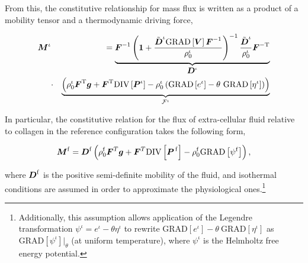 \noindent From this, the constitutive relationship for mass flux is
written as a product of a mobility tensor and a thermodynamic driving
force,

\begin{eqnarray}
\mbox{\boldmath$ M$}^\iota & &=\underbrace{\mbox{\boldmath$ F$}^{-1}\left({\bf 1} +
  \frac{\tilde{\mbox{\boldmath$ D$}}^\iota\mathrm{GRAD}\left[\mbox{\boldmath$ V$}\right]
    \mbox{\boldmath$ F$}^{-1}}{\rho^\iota_0}\right)^{-1}
  \frac{\tilde{\mbox{\boldmath$ D$}}^\iota}{\rho^\iota_0}\mbox{\boldmath$ F$}^{-\mathrm{T}}}_{\mbox{\boldmath$ D$}^\iota}
\nonumber\\ &\cdot&\underbrace{\left(\rho_0^\iota\mbox{\boldmath$ F$}^\mathrm{T}\mbox{\boldmath$ g$} +
  \mbox{\boldmath$ F$}^\mathrm{T}\mathrm{DIV}\left[\mbox{\boldmath$ P$}^\iota\right] -
  \rho^\iota_0\left(\mathrm{GRAD}\left[e^\iota\right] -
  \theta\ \mathrm{GRAD}\left[\eta^\iota\right]\right)\right)}
_{{\mathcal F}^\iota} 
\label{constitutive-relation-flux-3}
\end{eqnarray}

In particular, the constitutive relation for the flux of
extra-cellular fluid relative to collagen in the reference
configuration takes the following form,

\begin{equation}
\mbox{\boldmath$ M$}^\mathrm{f} = \mbox{\boldmath$ D$}^\mathrm{f}\left(\rho_0^\mathrm{f}\mbox{\boldmath$ F$}^T\mbox{\boldmath$ g$} +
\mbox{\boldmath$ F$}^T\mathrm{DIV}\left[\mbox{\boldmath$ P$}^{\,\mathrm{f}}\right] -
\rho_0^\mathrm{f}\mathrm{GRAD}\left[\psi^\mathrm{f}\right]\right),
\label{fluidflux}
\end{equation}

\noindent where $\mbox{\boldmath$ D$}^\mathrm{f}$ is the positive semi-definite
mobility of the fluid, and isothermal conditions are assumed in order
to approximate the physiological ones.\footnote{Additionally, this
  assumption allows application of the Legendre transformation
  \mbox{$\psi^\iota = e^\iota - \theta\eta^\iota$} to rewrite
  \mbox{$\mathrm{GRAD}\left[e^\iota\right] -
    \theta\ \mathrm{GRAD}\left[\eta^\iota\right]$} as
  $\mathrm{GRAD}\left[\psi^\iota\right]\vert_\theta$ (at uniform
  temperature), where $\psi^\iota$ is the Helmholtz free energy
  potential.}

